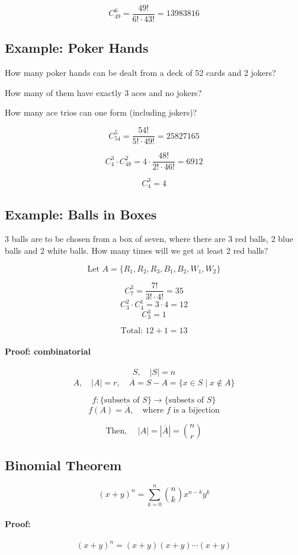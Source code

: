 \documentclass[11pt]{article}
\begin{document}
\[
C_{49}^6 = \frac{49!}{6! \cdot 43!} = 13983816
\]

\subsection*{Example: Poker Hands}
How many poker hands can be dealt from a deck of 52 cards and 2 jokers?

How many of them have exactly 3 aces and no jokers?

How many ace trios can one form (including jokers)?

\[
C_{54}^5 = \frac{54!}{5! \cdot 49!} = 25827165
\]

\[
C_{4}^3 \cdot C_{48}^2 = 4 \cdot \frac{48!}{2! \cdot 46!} = 6912
\]

\[
C_{4}^3 = 4
\]

\subsection*{Example: Balls in Boxes}
3 balls are to be chosen from a box of seven, where there are 3 red balls, 2 blue balls and 2 white balls. How many times will we get at least 2 red balls?

\[
\text{Let } A = \{R_1, R_2, R_3, B_1, B_2, W_1, W_2\}
\]

\[
C_7^3 = \frac{7!}{3! \cdot 4!} = 35
\]
\[
C_3^2 \cdot C_4^1 = 3 \cdot 4 = 12
\]
\[
C_3^3 = 1
\]

\[
\text{Total: } 12 + 1 = 13
\]

\paragraph{Proof: combinatorial}
\[
S, \quad |S| = n
\]
\[
A, \quad |A| = r, \quad \overline{A} = S - A = \{x \in S \mid x \notin A\}
\]

\[
f : \{ \text{subsets of } S\} \rightarrow \{ \text{subsets of } S\}
\]
\[
f(A) = \overline{A}, \quad \text{where } f \text{ is a bijection}
\]

\[
\text{Then, } \quad |A| = |\overline{A}| = \binom{n}{r}
\]

\subsection{Binomial Theorem}
\[
(x + y)^n = \sum_{k=0}^{n} \binom{n}{k} x^{n-k} y^k
\]

\paragraph{Proof:}
\[
(x + y)^n = (x + y)(x + y) \cdots (x + y)
\]
\end{document}
